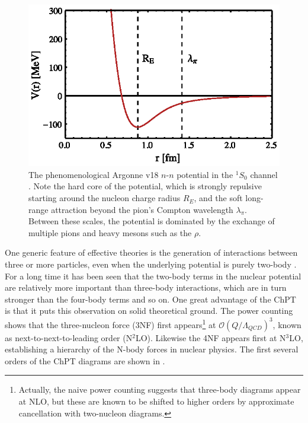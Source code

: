 \begin{figure}
\centering
\includegraphics[scale=1.0]{Introduction/Figures/OneSZero}
\caption[Separation of scales in the two-nucleon potential]{\label{fig:NuclearPotential} The phenomenological Argonne v18 $n$-$n$ potential in the $^1S_0$ channel \cite{PhysRevC.51.38}. Note the hard core of the potential, which is strongly repulsive starting around the nucleon charge radius $R_E$, and the soft long-range attraction beyond the pion's Compton wavelength $\lambda_\pi$. Between these scales, the potential is dominated by the exchange of multiple pions and heavy mesons such as the $\rho$.  } 
\end{figure}

One generic feature of effective theories is the generation of interactions between three or more particles, even when the underlying potential is purely two-body \cite{RevModPhys.85.197}. For a long time it has been seen that the two-body terms in the nuclear potential are relatively more important than three-body interactions, which are in turn stronger than the four-body terms and so on. One great advantage of the ChPT is that it puts this observation on solid theoretical ground. The power counting shows that the three-nucleon force (3NF) first appears\footnote{Actually, the naive power counting suggests that three-body diagrams appear at NLO, but these are known to be shifted to higher orders by approximate cancellation with two-nucleon diagrams\cite{PhysRevC.49.2932}.} at $\mathcal{O}(Q/\Lambda_{QCD})^3$, known as next-to-next-to-leading order (N$^2$LO). Likewise the 4NF appears first at N$^3$LO, establishing a hierarchy of the N-body forces in nuclear physics. The first several orders of the ChPT diagrams are shown in .

